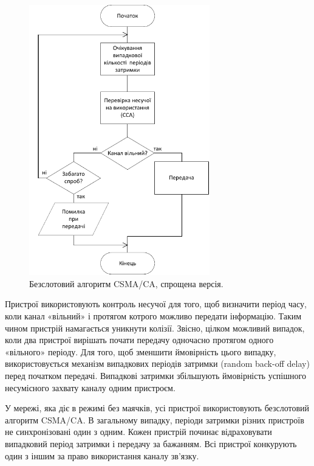 \documentclass[a4paper,ukrainian,utf8,nocolumnsxix,floatsection,equationsection]{eskdtext}
\newcommand{\csma}[0]{CSMA/CA\xspace}
\begin{document}
\begin{figure}[bth]
	\centering
	\includegraphics[width=0.7\textwidth]{img/csma-ca.pdf}
	\caption{\label{fig:csma-ca}Безслотовий алгоритм \csma, спрощена версія.}
\end{figure}

\afterpage{\clearpage}

Пристрої використовують контроль несучої для того, щоб визначити період часу, коли канал «вільний» і протягом котрого можливо передати інформацію. Таким чином пристрій намагається уникнути колізії. Звісно, цілком можливий випадок, коли два пристрої вирішать почати передачу  одночасно протягом одного  «вільного» періоду. Для того, щоб зменшити ймовірність цього випадку, використовується механізм випадкових періодів затримки (random back-off delay) перед початком передачі. Випадкові затримки збільшують ймовірність успішного несумісного захвату каналу одним пристроєм.

У мережі, яка діє в режимі без маячків, усі пристрої використовують безслотовий алгоритм \csma. В загальному випадку, періоди затримки різних пристроїв не синхронізовані один з одним.  Кожен пристрій починає відраховувати випадковий період затримки і передачу за бажанням. Всі пристрої конкурують один з іншим за право використання каналу зв’язку. 
\end{document}
